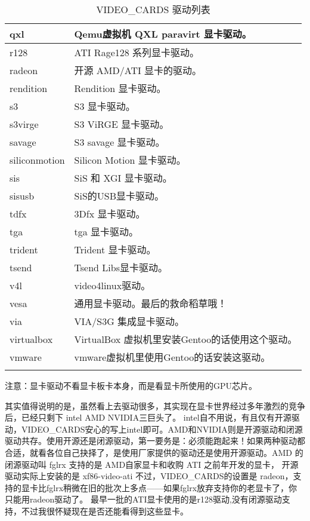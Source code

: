 \begin{longtable}{|l|p{}|}
qxl & Qemu虚拟机 QXL paravirt 显卡驱动。\\\hline
r128 & ATI Rage128 系列显卡驱动。\\\hline
radeon & 开源 AMD/ATI 显卡的驱动。 \\\hline
rendition & Rendition 显卡驱动。\\\hline
s3 & S3 显卡驱动。\\\hline
s3virge & S3 ViRGE 显卡驱动。\\\hline
savage & S3 savage 显卡驱动。\\\hline
siliconmotion & Silicon Motion 显卡驱动。\\\hline
sis &  SiS 和 XGI 显卡驱动。\\\hline
sisusb & SiS的USB显卡驱动。\\\hline
tdfx & 3Dfx 显卡驱动。\\\hline
tga & tga 显卡驱动。 \\\hline
trident & Trident 显卡驱动。\\\hline
tsend & Tsend Libs显卡驱动。\\\hline
v4l & video4linux驱动。\\\hline
vesa & 通用显卡驱动。最后的救命稻草哦！\\\hline
via & VIA/S3G 集成显卡驱动。\\\hline
virtualbox & VirtualBox 虚拟机里安装Gentoo的话使用这个驱动。\\\hline
vmware & vmware虚拟机里使用Gentoo的话安装这驱动。\\\hline

\caption{VIDEO\_CARDS 驱动列表}\label{table:videocards}
\end{longtable}


\begin{insertnote}
注意：显卡驱动不看显卡板卡本身，而是看显卡所使用的GPU芯片。
\end{insertnote}


其实值得说明的是，虽然看上去驱动很多，其实现在显卡世界经过多年激烈的竞争后，已经只剩下 intel AMD NVIDIA三巨头了。
intel自不用说，有且仅有开源驱动，VIDEO\_CARDS安心的写上intel即可。AMD和NVIDIA则是开源驱动和闭源驱动共存。使用开源还是闭源驱动，第一要务是：必须能跑起来！如果两种驱动都合适，就看各位自己抉择了，是使用厂家提供的驱动还是使用开源驱动。AMD 的闭源驱动叫 fglrx 支持的是 AMD自家显卡和收购 ATI 之前年开发的显卡， 开源驱动实际上安装的是 xf86-video-ati 不过，VIDEO\_CARDS的设置是 radeon，支持的显卡比fglrx稍微在旧的批次上多点——如果fglrx放弃支持你的老显卡了，你只能用radeon驱动了。 最早一批的ATI显卡使用的是r128驱动,没有闭源驱动支持，不过我很怀疑现在是否还能看得到这些显卡。

